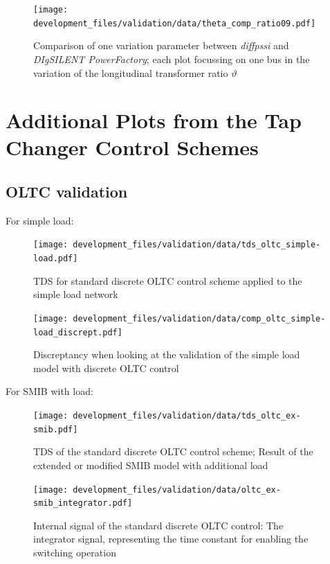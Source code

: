 \begin{figure}[H]
    \centering
    \texttt{[image: development\_files/validation/data/theta\_comp\_ratio09.pdf]}
    \caption{Comparison of one variation parameter between \textit{diffpssi} and \textit{DIgSILENT PowerFactory}; each plot focussing on one bus in the variation of the longitudinal transformer ratio $\vartheta$}
    \label{fig:valid-ratio-09}
\end{figure}

\section{Additional Plots from the Tap Changer Control Schemes}
\label{app:add-validation-tap-changer}

\subsection{OLTC validation}

For simple load:
\begin{figure}[H]
    \centering
    \texttt{[image: development\_files/validation/data/tds\_oltc\_simple-load.pdf]}
    \caption{\acf{TDS} for standard discrete \acs{OLTC} control scheme applied to the simple load network}
    \label{fig:valid-ratio-09}
\end{figure}

\begin{figure}[H]
    \centering
    \texttt{[image: development\_files/validation/data/comp\_oltc\_simple-load\_discrept.pdf]}
    \caption[Discreptancy bus voltages when looking at the validation of the simple load model with discrete \acs{OLTC} control]{Discreptancy when looking at the validation of the simple load model with discrete \acs{OLTC} control}
    \label{fig:comp-oltc-control-discrep}
\end{figure}

For SMIB with load:
\begin{figure}[H]
    \centering
    \texttt{[image: development\_files/validation/data/tds\_oltc\_ex-smib.pdf]}
    \caption[Time Domain Result of the OLTC control scheme applied on the extended \acs{SMIB} network]{\acf{TDS} of the standard discrete \acs{OLTC} control scheme; Result of the extended or modified \acs{SMIB} model with additional load}
    \label{fig:tds-oltc-ex-smib}
\end{figure}

\begin{figure}[H]
    \centering
    \texttt{[image: development\_files/validation/data/oltc\_ex-smib\_integrator.pdf]}
    \caption{Internal signal of the standard discrete \acs{OLTC} control: The integrator signal, representing the time constant for enabling the switching operation}
    \label{fig:int-signal-oltc-ext-smib-integrator}
\end{figure}

